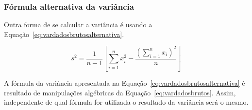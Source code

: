 \documentclass[11pt,fleqn]{book} %
\begin{document}
\vspace{0,3cm}
\subsubsection{Fórmula alternativa da variância}
\vspace{0,3cm}

Outra forma de se calcular a variância é usando a Equação~\ref{eq:vardadosbrutosalternativa}. \\

\begin{eBox}
\vspace{-0.5cm}
\begin{equation} \label{eq:vardadosbrutosalternativa}
s^2=\frac{1}{n-1}\left[\displaystyle\sum_{i=1}^{n}{x_i^2}-\frac{\left(\displaystyle\sum_{i=1}^{n} x_i \right)^2}{n}\right] 
\end{equation}
\end{eBox}

\vspace{0,3cm}


A fórmula da variância apresentada na Equação~\ref{eq:vardadosbrutosalternativa} é resultado de manipulações algébricas da Equação~\ref{eq:vardadosbrutos}. Assim, independente de qual fórmula for utilizada o resultado da variância será o mesmo. \\
\end{document}

